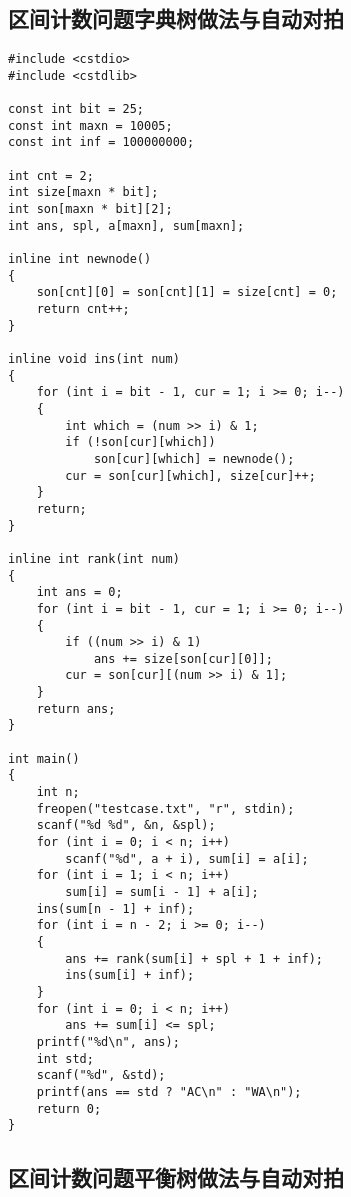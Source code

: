 \documentclass{article}
\begin{document}
\subsection{区间计数问题字典树做法与自动对拍}

\begin{lstlisting}
#include <cstdio>
#include <cstdlib>

const int bit = 25;
const int maxn = 10005;
const int inf = 100000000;

int cnt = 2;
int size[maxn * bit];
int son[maxn * bit][2];
int ans, spl, a[maxn], sum[maxn];

inline int newnode()
{
    son[cnt][0] = son[cnt][1] = size[cnt] = 0;
    return cnt++;
}

inline void ins(int num)
{
    for (int i = bit - 1, cur = 1; i >= 0; i--)
    {
        int which = (num >> i) & 1;
        if (!son[cur][which])
            son[cur][which] = newnode();
        cur = son[cur][which], size[cur]++;
    }
    return;
}

inline int rank(int num)
{
    int ans = 0;
    for (int i = bit - 1, cur = 1; i >= 0; i--)
    {
        if ((num >> i) & 1)
            ans += size[son[cur][0]];
        cur = son[cur][(num >> i) & 1];
    }
    return ans;
}

int main()
{
    int n;
    freopen("testcase.txt", "r", stdin);
    scanf("%d %d", &n, &spl);
    for (int i = 0; i < n; i++)
        scanf("%d", a + i), sum[i] = a[i];
    for (int i = 1; i < n; i++)
        sum[i] = sum[i - 1] + a[i];
    ins(sum[n - 1] + inf);
    for (int i = n - 2; i >= 0; i--)
    {
        ans += rank(sum[i] + spl + 1 + inf);
        ins(sum[i] + inf);
    }
    for (int i = 0; i < n; i++)
        ans += sum[i] <= spl;
    printf("%d\n", ans);
    int std;
    scanf("%d", &std);
    printf(ans == std ? "AC\n" : "WA\n");
    return 0;
}
\end{lstlisting}

\subsection{区间计数问题平衡树做法与自动对拍}
\end{document}
